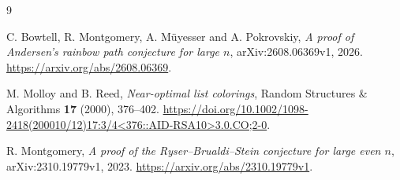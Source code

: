 \begin{thebibliography}{9}

C. Bowtell, R. Montgomery, A. M\"uyesser and A. Pokrovskiy,
\emph{A proof of Andersen's rainbow path conjecture for large $n$}, arXiv:2608.06369v1, 2026.
\url{https://arxiv.org/abs/2608.06369}.

M. Molloy and B. Reed,
\emph{Near-optimal list colorings},
Random Structures \& Algorithms \textbf{17} (2000), 376--402.
\url{https://doi.org/10.1002/1098-2418(200010/12)17:3/4<376::AID-RSA10>3.0.CO;2-0}.

R. Montgomery,
\emph{A proof of the Ryser--Brualdi--Stein conjecture for large even $n$}, arXiv:2310.19779v1, 2023.
\url{https://arxiv.org/abs/2310.19779v1}.
\end{thebibliography}
